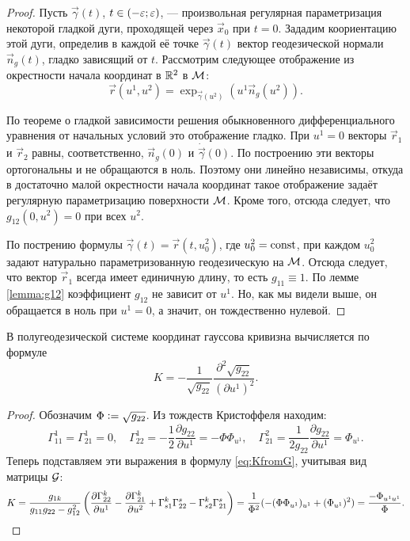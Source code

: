 \begin{proof}
	Пусть $\vec{\gamma}(t)$, $t \in (-\varepsilon; \varepsilon)$, --- произвольная регулярная параметризация некоторой гладкой дуги, проходящей через $\vec{x}_0$ при $t = 0$. Зададим коориентацию этой дуги, определив в каждой её точке $\vec{\gamma}(t)$ вектор геодезической нормали $\vec{n}_g(t)$, гладко зависящий от $t$. Рассмотрим следующее отображение из окрестности начала координат в $\mathbb{R}^2$ в $\mathcal{M}$:
	\[
		\vec{r}(u^1, u^2) = \exp_{\vec{\gamma}(u^2)}(u^1\vec{n}_g(u^2)).
	\]

	По теореме о гладкой зависимости решения обыкновенного дифференциального уравнения от начальных условий это отображение гладко. При $u^1 = 0$ векторы $\vec{r}_1$ и $\vec{r}_2$ равны, соответственно, $\vec{n}_g(0)$ и $\dot{\vec{\gamma}}(0)$. По построению эти векторы ортогональны и не обращаются в ноль. Поэтому они линейно независимы, откуда в достаточно малой окрестности начала координат такое отображение задаёт регулярную параметризацию поверхности $\mathcal{M}$. Кроме того, отсюда следует, что $g_{12}(0, u^2) = 0$ при всех $u^2$.

	По пострению формулы $\vec{\gamma}(t) = \vec{r}(t, u_0^2)$, где $u_0^2 = \mathrm{const}$, при каждом $u_0^2$ задают натурально параметризованную геодезическую на $\mathcal{M}$. Отсюда следует, что вектор $\vec{r}_1$ всегда имеет единичную длину, то есть $g_{11} \equiv 1$. По лемме \ref{lemma:g12} коэффициент $g_{12}$ не зависит от $u^1$. Но, как мы видели выше, он обращается в ноль при $u^1 = 0$, а значит, он тождественно нулевой.
\end{proof}

\begin{lemma} \label{lemma:GeoK}
	В полугеодезической системе координат гауссова кривизна вычисляется по формуле
	\begin{equation} \label{eq:GeoK}
		K = -\frac{1}{\sqrt{g_{22}}}\frac{\partial^2\sqrt{g_{22}}}{(\partial u^1)^2}.
	\end{equation}
\end{lemma}

\begin{proof}
	Обозначим $\Phi \vcentcolon = \sqrt{g_{22}}$. Из тождеств Кристоффеля находим:
	\[
		\Gamma_{11}^1 = \Gamma_{21}^1 = 0,\quad\Gamma_{22}^1 = -\frac{1}{2}\frac{\partial g_{22}}{\partial u^1} = -\Phi\Phi_{u^1},\quad\Gamma_{21}^2 = \frac{1}{2g_{22}}\frac{\partial g_{22}}{\partial u^1} = \Phi_{u^1}.
	\]
	Теперь подставляем эти выражения в формулу \eqref{eq:KfromG}, учитывая вид матрицы $\mathcal{G}$:
	\begin{multline*}
		K = \frac{g_{1k}}{g_{11}g_{22} - g_{12}^2}\left(\frac{\partial\Gamma^k_{22}}{\partial u^1} - \frac{\partial\Gamma_{21}^k}{\partial u^2} + \Gamma_{s1}^k\Gamma^s_{22} - \Gamma_{s2}^k\Gamma_{21}^s\right) = \frac{1}{\Phi^2}(-(\Phi\Phi_{u^1})_{u^1} + (\Phi_{u^1})^2) = \frac{-\Phi_{u^1u^1}}{\Phi}.
	\end{multline*}
\end{proof}

